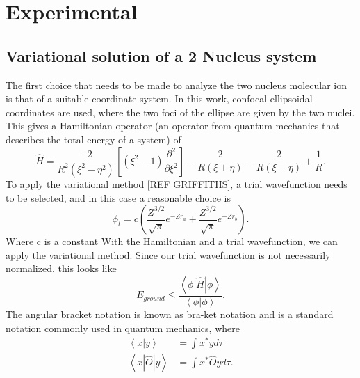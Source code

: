 \documentclass{achemso}
\begin{document}
\section{Experimental}
\subsection{Variational solution of a 2 Nucleus system}
The first choice that needs to be made to analyze the two nucleus  molecular ion is that of a suitable coordinate system.  In this work, confocal ellipsoidal coordinates are used, where the two foci of the ellipse are given by the two nuclei.  This gives a Hamiltonian operator (an operator from quantum mechanics that describes the total energy of a system) of
\begin{equation}
	\hat{H} = \frac{-2}{R^2\left(\xi^2-\eta^2\right)}\left[\left(\xi^2-1\right)\frac{\partial^2 }{\partial\xi^2}\right]-\frac{2}{R(\xi+\eta)}-\frac{2}{R(\xi-\eta)}+\frac{1}{R}.
\end{equation}
To apply the variational method [REF GRIFFITHS], a trial wavefunction needs to be selected, and in this case a reasonable choice is
\begin{equation}
	\phi_t = c\left(\frac{Z^{3/2}}{\sqrt{\pi}}e^{-Zr_a} + \frac{Z^{3/2}}{\sqrt{\pi}}e^{-Zr_b}\right).
\end{equation}
Where c is a constant
With the Hamiltonian and a trial wavefunction, we can apply the variational method.  Since our trial wavefunction is not necessarily normalized, this looks like
\begin{equation}
E_{ground} \leq \frac{\left<\phi | \hat{H} | \phi \right>}{\left<\phi|\phi\right>}.
\end{equation} 
The angular bracket notation is known as bra-ket notation and is a standard notation commonly used in quantum mechanics, where
\begin{align}
	\left<x|y\right> &= \int x^* y d\tau \\
	\left<x|\hat{O}|y\right> &= \int x^* \hat{O}yd\tau.
\end{align}
\end{document}
